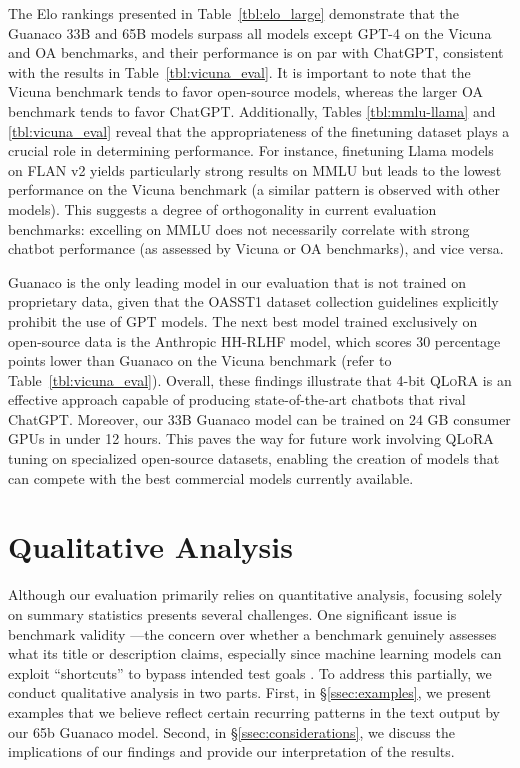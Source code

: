 The Elo rankings presented in Table~\ref{tbl:elo_large} demonstrate that the {Guanaco} 33B and 65B models surpass all models except GPT-4 on the Vicuna and OA benchmarks, and their performance is on par with ChatGPT, consistent with the results in Table~\ref{tbl:vicuna_eval}. It is important to note that the Vicuna benchmark tends to favor open-source models, whereas the larger OA benchmark tends to favor ChatGPT. Additionally, Tables \ref{tbl:mmlu-llama} and \ref{tbl:vicuna_eval} reveal that the appropriateness of the finetuning dataset plays a crucial role in determining performance. For instance, finetuning Llama models on FLAN v2 yields particularly strong results on MMLU but leads to the lowest performance on the Vicuna benchmark (a similar pattern is observed with other models). This suggests a degree of orthogonality in current evaluation benchmarks: excelling on MMLU does not necessarily correlate with strong chatbot performance (as assessed by Vicuna or OA benchmarks), and vice versa.

{Guanaco} is the only leading model in our evaluation that is not trained on proprietary data, given that the OASST1 dataset collection guidelines explicitly prohibit the use of GPT models. The next best model trained exclusively on open-source data is the Anthropic HH-RLHF model, which scores 30 percentage points lower than {Guanaco} on the Vicuna benchmark (refer to Table~\ref{tbl:vicuna_eval}). Overall, these findings illustrate that 4-bit \textsc{QLoRA} is an effective approach capable of producing state-of-the-art chatbots that rival ChatGPT. Moreover, our 33B {Guanaco} model can be trained on 24 GB consumer GPUs in under 12 hours. This paves the way for future work involving \textsc{QLoRA} tuning on specialized open-source datasets, enabling the creation of models that can compete with the best commercial models currently available.

\section{Qualitative Analysis}

Although our evaluation primarily relies on quantitative analysis, focusing solely on summary statistics presents several challenges. One significant issue is benchmark validity \citep{liao2021we}—the concern over whether a benchmark genuinely assesses what its title or description claims, especially since machine learning models can exploit ``shortcuts'' to bypass intended test goals \citep{gururangan2018annotation, poliak2018hypothesis}. To address this partially, we conduct qualitative analysis in two parts. First, in \S\ref{ssec:examples}, we present examples that we believe reflect certain recurring patterns in the text output by our 65b {Guanaco} model. Second, in \S\ref{ssec:considerations}, we discuss the implications of our findings and provide our interpretation of the results.

